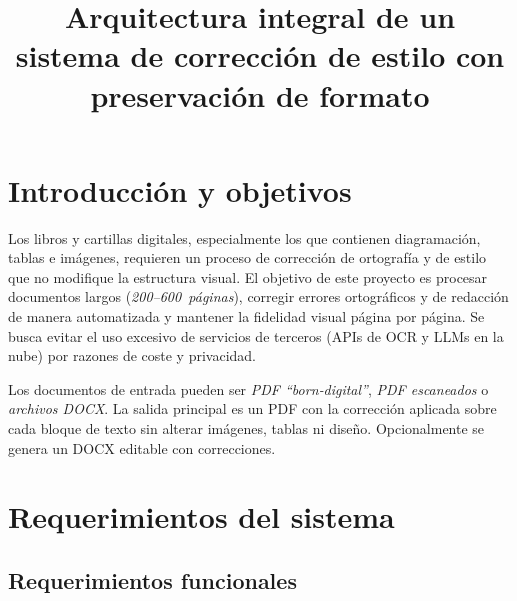 \documentclass[12pt]{article}
\begin{document}
\title{Arquitectura integral de un sistema de corrección de estilo con preservación de formato}
\author{}
\date{}
\maketitle

\tableofcontents
\newpage

\section{Introducción y objetivos}

Los libros y cartillas digitales, especialmente los que contienen diagramación, tablas e imágenes, requieren
un proceso de corrección de ortografía y de estilo que no modifique la estructura visual.  El objetivo
de este proyecto es procesar documentos largos (\textit{200--600 páginas}), corregir errores ortográficos y de
redacción de manera automatizada y mantener la fidelidad visual página por página.  Se busca evitar el uso
excesivo de servicios de terceros (APIs de OCR y LLMs en la nube) por razones de coste y privacidad.

Los documentos de entrada pueden ser \emph{PDF “born‑digital”}, \emph{PDF escaneados} o \emph{archivos DOCX}.
La salida principal es un PDF con la corrección aplicada sobre cada bloque de texto sin alterar imágenes,
tablas ni diseño.  Opcionalmente se genera un DOCX editable con correcciones.

\section{Requerimientos del sistema}

\subsection{Requerimientos funcionales}
\end{document}
